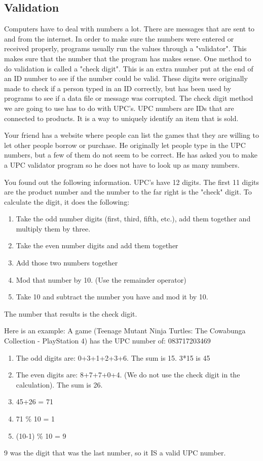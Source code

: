 \subsection{Validation}
Computers have to deal with numbers a lot. There are messages that are sent to and from the internet. In order to make sure the numbers were entered or received properly, programs usually
run the values through a "validator". This makes sure that the
number that the program has makes sense. One method to 
do validation is called a "check digit". This is an extra number
put at the end of an ID number to see if the number could
be valid. These digits were originally made to check if a 
person typed in an ID correctly, but has been used by programs
to see if a data file or message was corrupted. The check digit
method we are going to use has to do with UPC's. UPC numbers are IDs that are connected to products. It is a way to uniquely identify an item that is sold.

Your friend has a website where people can list the games that
they are willing to let other people borrow or purchase. He
originally let people type in the UPC numbers, but a few of 
them do not seem to be correct. He has asked you to make a 
UPC validator program so he does not have to look up as many 
numbers.

You found out the following information. UPC's have 12 digits.
The first 11 digits are the product number and the number to the
far right is the "check" digit. To calculate the digit, it does
the following:
\begin{enumerate}
    \item Take the odd number digits (first, third, fifth, etc.), add them together and multiply them by three.
    \item Take the even number digits and add them together
    \item Add those two numbers together
    \item Mod that number by 10. (Use the remainder operator)
    \item Take 10 and subtract the number you have and mod it by 10. 
\end{enumerate}
The number that results is the check digit.

Here is an example: A game (Teenage Mutant Ninja Turtles: The Cowabunga Collection - PlayStation 4) has the UPC number of:
083717203469
\begin{enumerate}
    \item The odd digits are: 0+3+1+2+3+6. The sum is 15. 3*15 is 45
    \item The even digits are: 8+7+7+0+4. (We do not use the check digit in the calculation). The sum is 26.
    \item 45+26 = 71
    \item 71 \% 10 = 1
    \item (10-1) \% 10 = 9
\end{enumerate}
9 was the digit that was the last number, so it IS a valid UPC 
number.

